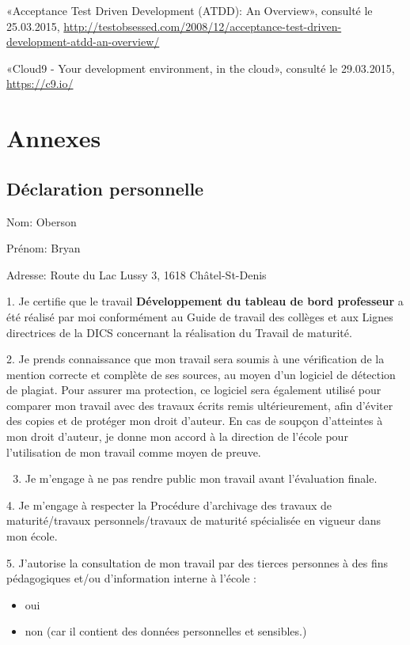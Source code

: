 \documentclass[a4paper,10pt,french]{sphinxmanual}
\begin{document}
«Acceptance Test Driven Development (ATDD): An Overview»,
consulté le 25.03.2015,
\href{http://testobsessed.com/2008/12/acceptance-test-driven-development-atdd-an-overview/}{http://testobsessed.com/2008/12/acceptance-test-driven-development-atdd-an-overview/}

«Cloud9 - Your development environment, in the cloud»,
consulté le 29.03.2015,
\href{https://c9.io/}{https://c9.io/}


\chapter{Annexes}
\label{annexes::doc}\label{annexes:annexes}

\section{Déclaration personnelle}
\label{annexes:declaration-personnelle}
Nom: Oberson

Prénom: Bryan

Adresse: Route du Lac Lussy 3, 1618 Châtel-St-Denis

1. Je certifie que le travail
\textbf{Développement du tableau de bord professeur}
a été réalisé par moi conformément au Guide de travail des collèges et aux
Lignes directrices de la DICS concernant la réalisation du Travail de maturité.

2. Je prends connaissance que mon travail sera soumis à une vérification de la
mention correcte et complète de ses sources, au moyen d’un logiciel de détection
de plagiat. Pour assurer ma protection, ce logiciel sera également utilisé pour
comparer mon travail avec des travaux écrits remis ultérieurement, afin d’éviter
des copies et de protéger mon droit d’auteur. En cas de soupçon d’atteintes à
mon droit d’auteur, je donne mon accord à la direction de l’école pour
l’utilisation de mon travail comme moyen de preuve.
\begin{enumerate}
\setcounter{enumi}{2}
\item {} 
Je m'engage à ne pas rendre public mon travail avant l'évaluation finale.

\end{enumerate}

4. Je m’engage à respecter la Procédure d’archivage des travaux de
maturité/travaux personnels/travaux de maturité spécialisée en vigueur dans mon
école.

5. J’autorise la consultation de mon travail par des tierces personnes à des
fins pédagogiques et/ou d’information interne à l’école :
\begin{itemize}
\item {} 
oui

\item {} 
non (car il contient des données personnelles et sensibles.)

\end{itemize}
\end{document}
